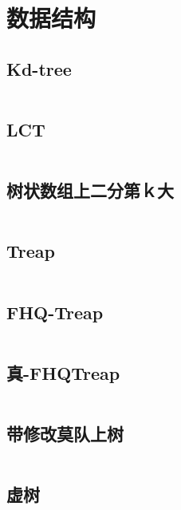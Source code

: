 \chapter{数据结构}
\section{Kd-tree}
\inputminted{cpp}{\source/data-structure/Kd-tree.cpp}
\section{LCT}
\inputminted{cpp}{\source/data-structure/LCT.cpp}
\section{树状数组上二分第ｋ大}
\inputminted{cpp}{\source/data-structure/fenwicktree_kth.cpp}
\section{Treap}
\inputminted{cpp}{\source/data-structure/Treap.cpp}
\section{FHQ-Treap}
\inputminted{cpp}{\source/data-structure/fhqTreap.cpp}
\section{真-FHQTreap}
\inputminted{cpp}{\source/data-structure/true.fhqtreap.cpp}
\section{带修改莫队上树}
\inputminted{cpp}{\source/data-structure/mo-team-on-tree.cpp}
\section{虚树}
\inputminted{cpp}{\source/data-structure/virtual-tree.cpp}